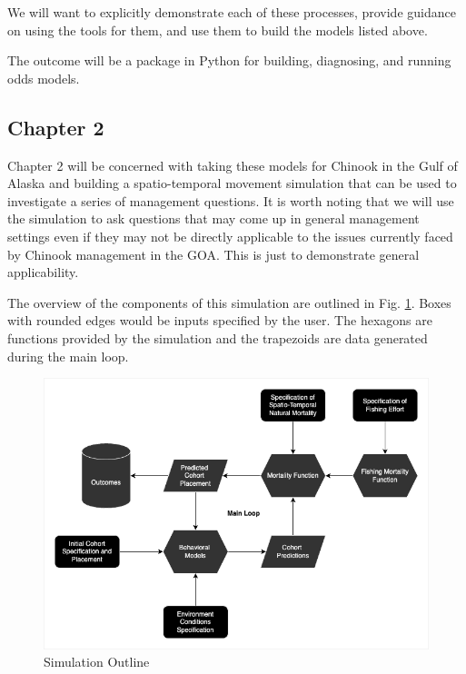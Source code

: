\documentclass[11pt]{article}
\begin{document}
We will want to explicitly demonstrate each of these processes, provide guidance on using the tools for them, and use them to build the models listed above. \newline

The outcome will be a package in Python for building, diagnosing, and running odds models.

\subsection{Chapter 2}

Chapter 2 will be concerned with taking these models for Chinook in the Gulf of Alaska and building a spatio-temporal movement simulation that can be used to investigate a series of management questions. It is worth noting that we will use the simulation to ask questions that may come up in general management settings even if they may not be directly applicable to the issues currently faced by Chinook management in the GOA. This is just to demonstrate general applicability. \newline

The overview of the components of this simulation are outlined in Fig. \ref{fig:simulation}. Boxes with rounded edges would be inputs specified by the user. The hexagons are functions provided by the simulation and the trapezoids are data generated during the main loop. 

\begin{figure}[h!] 
  \includegraphics[width=\linewidth]{simulation.png}
  \caption{Simulation Outline}
  \label{fig:simulation}
\end{figure}
\end{document}
